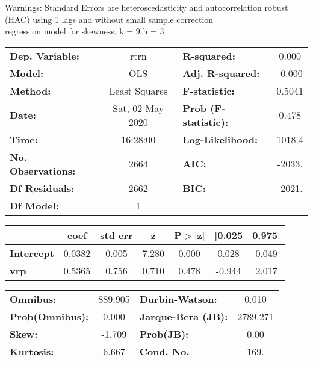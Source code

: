 Warnings: \newline
 [1] Standard Errors are heteroscedasticity and autocorrelation robust (HAC) using 1 lags and without small sample correction\\ 

regression model for skewness, k = 9 h = 3\begin{center}
\begin{tabular}{lclc}
\toprule
\textbf{Dep. Variable:}    &       rtrn       & \textbf{  R-squared:         } &     0.000   \\
\textbf{Model:}            &       OLS        & \textbf{  Adj. R-squared:    } &    -0.000   \\
\textbf{Method:}           &  Least Squares   & \textbf{  F-statistic:       } &    0.5041   \\
\textbf{Date:}             & Sat, 02 May 2020 & \textbf{  Prob (F-statistic):} &    0.478    \\
\textbf{Time:}             &     16:28:00     & \textbf{  Log-Likelihood:    } &    1018.4   \\
\textbf{No. Observations:} &        2664      & \textbf{  AIC:               } &    -2033.   \\
\textbf{Df Residuals:}     &        2662      & \textbf{  BIC:               } &    -2021.   \\
\textbf{Df Model:}         &           1      & \textbf{                     } &             \\
\bottomrule
\end{tabular}
\begin{tabular}{lcccccc}
                   & \textbf{coef} & \textbf{std err} & \textbf{z} & \textbf{P$> |$z$|$} & \textbf{[0.025} & \textbf{0.975]}  \\
\midrule
\textbf{Intercept} &       0.0382  &        0.005     &     7.280  &         0.000        &        0.028    &        0.049     \\
\textbf{vrp}       &       0.5365  &        0.756     &     0.710  &         0.478        &       -0.944    &        2.017     \\
\bottomrule
\end{tabular}
\begin{tabular}{lclc}
\textbf{Omnibus:}       & 889.905 & \textbf{  Durbin-Watson:     } &    0.010  \\
\textbf{Prob(Omnibus):} &   0.000 & \textbf{  Jarque-Bera (JB):  } & 2789.271  \\
\textbf{Skew:}          &  -1.709 & \textbf{  Prob(JB):          } &     0.00  \\
\textbf{Kurtosis:}      &   6.667 & \textbf{  Cond. No.          } &     169.  \\
\bottomrule
\end{tabular}
\end{center}

